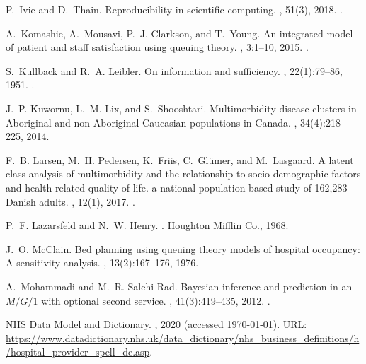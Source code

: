 \documentclass[11pt]{article}
\begin{document}
\begin{thebibliography}{10}
P.~Ivie and D.~Thain.
\newblock Reproducibility in scientific computing.
, 51(3), 2018.
\newblock \href {https://doi.org/10.1145/3186266} {}.

A.~Komashie, A.~Mousavi, P.~J. Clarkson, and T.~Young.
\newblock An integrated model of patient and staff satisfaction using queuing
  theory.
, 3:1--10, 2015.
\newblock \href {https://doi.org/10.1109/JTEHM.2015.2400436}
  {}.

S.~Kullback and R.~A. Leibler.
\newblock On information and sufficiency.
, 22(1):79--86, 1951.
\newblock \href {https://doi.org/10.1214/aoms/1177729694}
  {}.

J.~P. Kuwornu, L.~M. Lix, and S.~Shooshtari.
\newblock Multimorbidity disease clusters in {Aboriginal} and {non-Aboriginal}
  {Caucasian} populations in {Canada}.
, 34(4):218--225, 2014.

F.~B. Larsen, M.~H. Pedersen, K.~Friis, C.~Gl\"{u}mer, and M.~Lasgaard.
\newblock A latent class analysis of multimorbidity and the relationship to
  socio-demographic factors and health-related quality of life. a national
  population-based study of 162,283 {Danish} adults.
, 12(1), 2017.
\newblock \href {https://doi.org/10.1371/journal.pone.0169426}
  {}.

P.~F. Lazarsfeld and N.~W. Henry.
.
\newblock Houghton Mifflin Co., 1968.

J.~O. McClain.
\newblock Bed planning using queuing theory models of hospital occupancy: A
  sensitivity analysis.
, 13(2):167--176, 1976.

A.~Mohammadi and M.~R. Salehi-Rad.
\newblock Bayesian inference and prediction in an {$M/G/1$} with optional
  second service.
,
  41(3):419--435, 2012.
\newblock \href {https://doi.org/10.1080/03610918.2011.588358}
  {}.

{NHS Data Model and Dictionary}.
, 2020 (accessed
  \today).
\newblock URL:
  \url{https://www.datadictionary.nhs.uk/data_dictionary/nhs_business_definitions/h/hospital_provider_spell_de.asp}.


\end{thebibliography}
\end{document}
